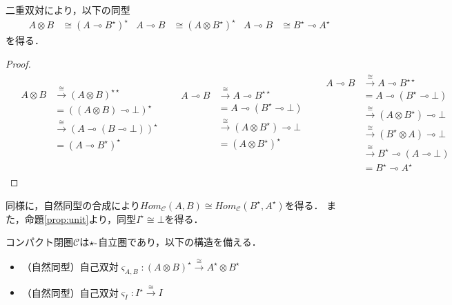 \documentclass[type_judgement.tex]{subfiles}
\begin{document}
二重双対により，以下の同型
\begin{align*}
    A \otimes B &\cong (A \multimap B^\star)^\star  &  A \multimap B &\cong (A \otimes B^\star)^\star  &  A \multimap B &\cong B^\star \multimap A^\star
\end{align*}
を得る．
\begin{proof}
\begin{align*}
&\begin{aligned}
    A \otimes B &\xrightarrow{\cong} (A \otimes B)^{\star\star} \\
    &= ((A \otimes B) \multimap \bot)^\star \\
    &\xrightarrow{\cong} (A \multimap (B \multimap \bot))^\star \\
    &= (A \multimap B^\star)^\star \\
    & \\
    &
\end{aligned}
&
&\begin{aligned}
    A \multimap B &\xrightarrow{\cong} A \multimap B^{\star\star} \\
    &= A \multimap (B^\star \multimap \bot) \\
    &\xrightarrow{\cong} (A \otimes B^\star) \multimap \bot \\
    &= (A \otimes B^\star)^\star \\
    & \\
    &
\end{aligned}
&
&\begin{aligned}
    A \multimap B &\xrightarrow{\cong} A \multimap B^{\star\star} \\
    &= A \multimap (B^\star \multimap \bot) \\
    &\xrightarrow{\cong} (A \otimes B^\star) \multimap \bot \\
    &\xrightarrow{\cong} (B^\star \otimes A) \multimap \bot \\
    &\xrightarrow{\cong} B^\star \multimap (A \multimap \bot) \\
    &= B^\star \multimap A^\star
\end{aligned}
\end{align*}
\end{proof}

同様に，自然同型の合成により$Hom_\mathcal{C}(A,B) \cong Hom_\mathcal{C}(B^\star, A^\star)$を得る．
また，命題\ref{prop:unit}より，同型$I^\star \cong \bot$を得る．

\begin{defn}
コンパクト閉圏$\mathcal{C}$は$\star\mathchar`-$自立圏であり，以下の構造を備える．
\begin{itemize}
    \item （自然同型）自己双対$\varsigma_{A,B}:(A \otimes B)^\star \xrightarrow{\cong} A^\star \otimes B^\star$
    \item （自然同型）自己双対$\varsigma_I:I^\star \xrightarrow{\cong} I$
\end{itemize}
\end{defn}
\end{document}
